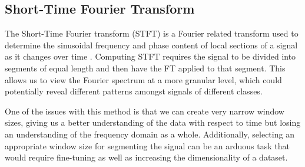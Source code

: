 \documentclass{turabian-thesis}
\begin{document}




\subsection{Short-Time Fourier Transform}
The Short-Time Fourier transform (STFT) is a Fourier related transform used to determine the sinusoidal frequency and phase content of local sections of a signal as it changes over time \cite{hill_uncertainty_nodate}.
Computing STFT requires the signal to be divided into segments of equal length and then have the FT applied to that segment. This allows us to view the Fourier spectrum at a more granular level, which could potentially reveal different patterns amongst signals of different classes.


One of the issues with this method is that we can create very narrow window sizes, giving us a better understanding of the data with respect to time but losing an understanding of the frequency domain as a whole. Additionally, selecting an appropriate window size for segmenting the signal can be an arduous task that would require fine-tuning as well as increasing the dimensionality of a dataset.
\end{document}

